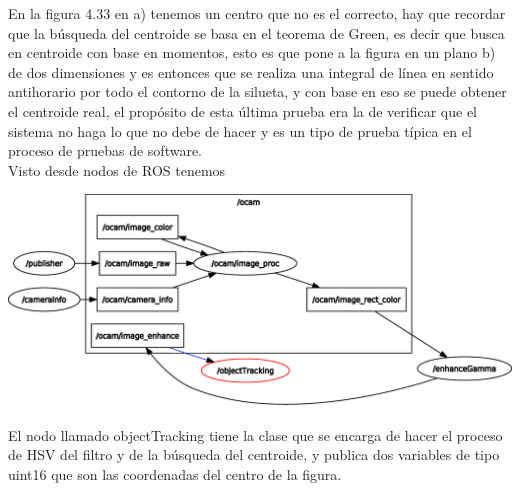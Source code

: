 En la figura 4.33 en a) tenemos un centro que no es el correcto, hay que recordar que la búsqueda del centroide se basa en el teorema de Green,
es decir que busca en centroide con base en momentos, esto es que pone a la figura en un plano b) de dos dimensiones y es
entonces que se realiza una integral de línea en sentido antihorario por todo el contorno de la silueta, y con base en eso
se puede obtener el centroide real, el propósito de esta última prueba era la de verificar que el sistema no haga lo que
no debe de hacer y es un tipo de prueba típica en el proceso de pruebas de software.\\
Visto desde nodos de ROS tenemos
\begin{center}
	\includegraphics[width=1.0 \textwidth]{Contenido/Cuerpo/Capitulo4/Fig30.eps}
	\label{Fig9}
\end{center}
El nodo llamado objectTracking tiene la clase que se encarga de hacer el proceso de HSV del filtro y de la búsqueda del
centroide, y publica dos variables de tipo uint16 que son las coordenadas del centro de la figura.